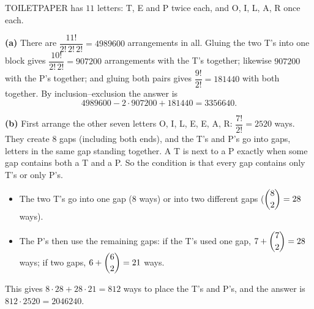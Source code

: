 TOILETPAPER has $11$ letters: T, E and P twice each, and O, I, L, A, R once each.

\textbf{(a)} There are $\dfrac{11!}{2!\,2!\,2!}=4989600$ arrangements in all. Gluing the two T's into one block gives $\dfrac{10!}{2!\,2!}=907200$ arrangements with the T's together; likewise $907200$ with the P's together; and gluing both pairs gives $\dfrac{9!}{2!}=181440$ with both together. By inclusion--exclusion the answer is
\[4989600-2\cdot907200+181440=\boxed{3356640}.\]

\textbf{(b)} First arrange the other seven letters O, I, L, E, E, A, R: $\dfrac{7!}{2!}=2520$ ways. They create $8$ gaps (including both ends), and the T's and P's go into gaps, letters in the same gap standing together. A T is next to a P exactly when some gap contains both a T and a P. So the condition is that every gap contains only T's or only P's.
\begin{itemize}
\item The two T's go into one gap ($8$ ways) or into two different gaps ($\dbinom82=28$ ways).
\item The P's then use the remaining gaps: if the T's used one gap, $7+\dbinom72=28$ ways; if two gaps, $6+\dbinom62=21$ ways.
\end{itemize}
This gives $8\cdot28+28\cdot21=812$ ways to place the T's and P's, and the answer is $812\cdot2520=\boxed{2046240}$.

